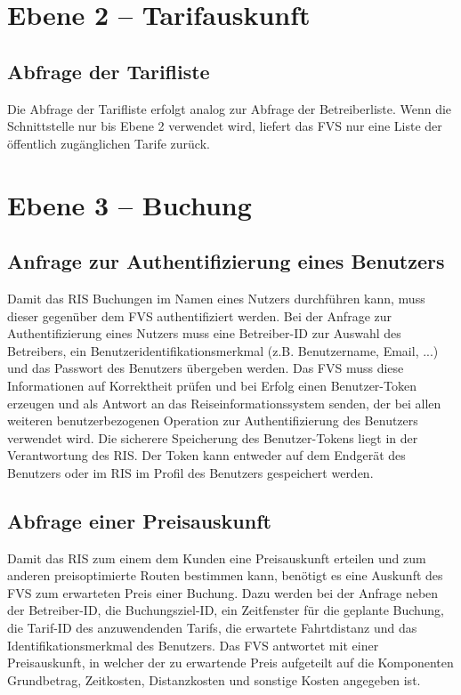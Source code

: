 \section{Ebene 2 -- Tarifauskunft}

\subsection{Abfrage der Tarifliste}
Die Abfrage der Tarifliste erfolgt analog zur Abfrage der Betreiberliste. Wenn die Schnittstelle nur bis Ebene 2 verwendet wird, liefert das FVS nur eine Liste der öffentlich zugänglichen Tarife zurück.

\section{Ebene 3 -- Buchung}

\subsection{Anfrage zur Authentifizierung eines Benutzers}
Damit das RIS Buchungen im Namen eines Nutzers durchführen kann, muss dieser gegenüber dem FVS authentifiziert werden. Bei der Anfrage zur Authentifizierung eines Nutzers muss eine Betreiber-ID zur Auswahl des Betreibers, ein Benutzeridentifikationsmerkmal (z.B. Benutzername, Email, ...) und das Passwort des Benutzers übergeben werden. Das FVS muss diese Informationen auf Korrektheit prüfen und bei Erfolg einen Benutzer-Token erzeugen und als Antwort an das Reiseinformationssystem senden, der bei allen weiteren benutzerbezogenen Operation zur Authentifizierung des Benutzers verwendet wird. Die sicherere Speicherung des Benutzer-Tokens liegt in der Verantwortung des RIS. Der Token kann entweder auf dem Endgerät des Benutzers oder im RIS im Profil des Benutzers gespeichert werden.

\subsection{Abfrage einer Preisauskunft}
 Damit das RIS zum einem dem Kunden eine Preisauskunft erteilen und zum anderen preisoptimierte Routen bestimmen kann, benötigt es eine Auskunft des FVS zum erwarteten Preis einer Buchung. Dazu werden bei der Anfrage neben der Betreiber-ID, die Buchungsziel-ID, ein Zeitfenster für die geplante Buchung, die Tarif-ID des anzuwendenden Tarifs, die erwartete Fahrtdistanz und das Identifikationsmerkmal des Benutzers. Das FVS antwortet mit einer Preisauskunft, in welcher der zu erwartende Preis aufgeteilt auf die Komponenten Grundbetrag, Zeitkosten, Distanzkosten und sonstige Kosten angegeben ist.
 

